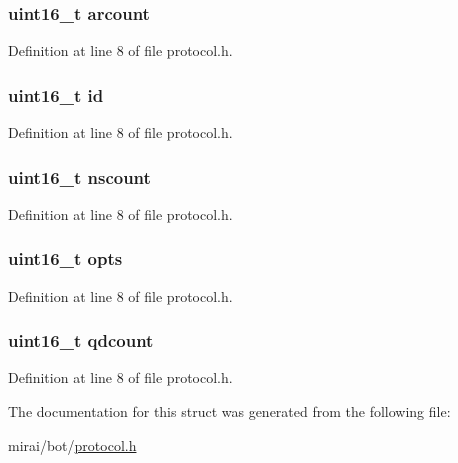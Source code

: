 \subsubsection[{\texorpdfstring{arcount}{arcount}}]{\setlength{\rightskip}{0pt plus 5cm}uint16\+\_\+t arcount}\hypertarget{structdnshdr_a6eedffaf6f8d915f67e6f6bb77094562}{}\label{structdnshdr_a6eedffaf6f8d915f67e6f6bb77094562}


Definition at line 8 of file protocol.\+h.

\subsubsection[{\texorpdfstring{id}{id}}]{\setlength{\rightskip}{0pt plus 5cm}uint16\+\_\+t id}\hypertarget{structdnshdr_a4fc3a0c58dfbd1e68224521185cb9384}{}\label{structdnshdr_a4fc3a0c58dfbd1e68224521185cb9384}


Definition at line 8 of file protocol.\+h.

\subsubsection[{\texorpdfstring{nscount}{nscount}}]{\setlength{\rightskip}{0pt plus 5cm}uint16\+\_\+t nscount}\hypertarget{structdnshdr_aa613b2dc181144b8d4c975a5260d59e3}{}\label{structdnshdr_aa613b2dc181144b8d4c975a5260d59e3}


Definition at line 8 of file protocol.\+h.

\subsubsection[{\texorpdfstring{opts}{opts}}]{\setlength{\rightskip}{0pt plus 5cm}uint16\+\_\+t opts}\hypertarget{structdnshdr_a603d5a096df0308ac97dbf3e7d808733}{}\label{structdnshdr_a603d5a096df0308ac97dbf3e7d808733}


Definition at line 8 of file protocol.\+h.

\subsubsection[{\texorpdfstring{qdcount}{qdcount}}]{\setlength{\rightskip}{0pt plus 5cm}uint16\+\_\+t qdcount}\hypertarget{structdnshdr_a04016da27d1b8b5859d8527d2742f4f4}{}\label{structdnshdr_a04016da27d1b8b5859d8527d2742f4f4}


Definition at line 8 of file protocol.\+h.



The documentation for this struct was generated from the following file\+:\begin{DoxyCompactItemize}
\item 
mirai/bot/\hyperlink{protocol_8h}{protocol.\+h}\end{DoxyCompactItemize}
